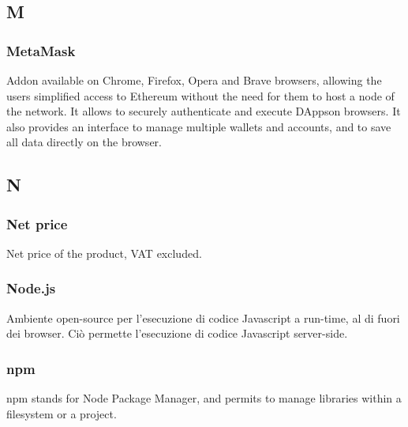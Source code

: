 

\subsection*{M}

\subsubsection*{MetaMask}
Addon available on Chrome, Firefox, Opera and Brave browsers, allowing the users simplified access to Ethereum without the need for them to host a node of the network.
It allows to securely authenticate and execute DApps\glosp on browsers. It also provides an interface to manage multiple wallets and accounts, and to save all data directly on the browser.


\subsection*{N}

\subsubsection*{Net price}
Net price of the product, VAT excluded.

\subsubsection*{Node.js}
Ambiente open-source per l'esecuzione di codice Javascript a run-time, al di fuori dei browser. Ciò permette l'esecuzione di codice Javascript server-side.

\subsubsection*{npm}
npm stands for Node Package Manager, and permits to manage libraries within a filesystem or a project.




